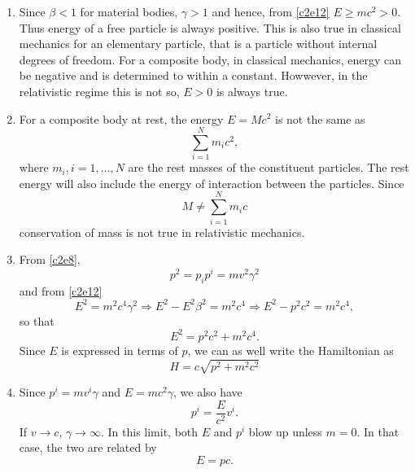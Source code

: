 \begin{enumerate}
\item Since $\beta < 1$ for material bodies, $\gamma > 1$ and hence, from 
\eqref{c2e12} $E \ge mc^2 > 0$. Thus energy of a free particle is always positive.
This is also true in classical mechanics for an elementary particle, that is a
particle without internal degrees of freedom. For a composite body, in classical
mechanics, energy can be negative and is determined to within a constant. Howwever,
in the relativistic regime this is not so, $E > 0$ is always true.

\item For a composite body at rest, the energy $E = Mc^2$ is not the same as 
\[
\sum_{i=1}^N m_ic^2,
\]
where $m_i, i = 1, \ldots, N$ are the rest masses of the constituent particles.
The rest energy will also include the energy of interaction between the particles.
Since 
\[
M \ne \sum_{i=1}^N m_ic
\]
conservation of mass is not true in relativistic mechanics.

\item From \eqref{c2e8},
\[
p^2 = p_ip^i = mv^2\gamma^2
\]
and from \eqref{c2e12}
\[
E^2 = m^2c^4\gamma^2 \Rightarrow E^2 - E^2\beta^2 = m^2c^4 \Rightarrow 
E^2 - p^2c^2  = m^2c^4,
\]
so that
\begin{equation}\label{c2e15}
E^2 = p^2c^2 + m^2c^4.
\end{equation}
Since $E$ is expressed in terms of $p$, we can as well write the Hamiltonian as
\begin{equation}\label{c2e16}
H = c\sqrt{p^2 + m^2c^2}
\end{equation}

\item Since $p^i = mv^i\gamma$ and $E = mc^2\gamma$, we also have
\begin{equation}\label{c2e17}
p^i = \frac{E}{c^2}v^i.
\end{equation}
If $v \rightarrow c$, $\gamma \rightarrow \infty$. In this limit, both $E$ and
$p^i$ blow up unless $m = 0$. In that case, the two are related by
\begin{equation}\label{c2e18}
E = pc.
\end{equation}


\end{enumerate}

